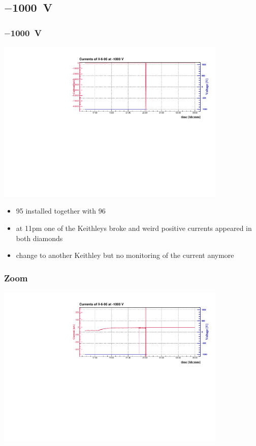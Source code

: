 \documentclass[9pt]{beamer}
\begin{document}
\subsection{$-$\SI{1000}{V}}
\begin{frame}
	\frametitle{$-$\SI{1000}{V}}
	\vspace*{-15pt}
	\begin{center}
		\includegraphics[angle=270, width=11cm]{II-6-95_-1000}
	\end{center}
	\begin{itemize}
		\item 95 installed together with 96
		\item at 11pm one of the Keithleys broke and weird positive currents appeared in both diamonds
		\item change to another Keithley but no monitoring of the current anymore
	\end{itemize}
\end{frame}
\begin{frame}
	\frametitle{Zoom}
	\vspace*{-15pt}
	\begin{center}
		\includegraphics[angle=270, width=11cm]{II-6-95_-1000Zoom}
	\end{center}
\end{frame}
\end{document}
